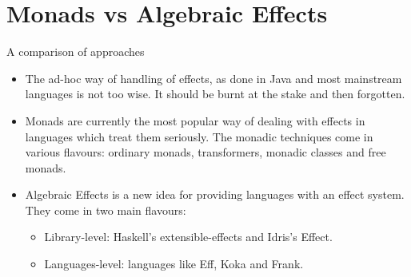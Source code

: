 \documentclass{beamer}
\begin{document}
\section{Monads vs Algebraic Effects}

\begin{frame}{A comparison of approaches}
\begin{itemize}
	\item The ad-hoc way of handling of effects, as done in Java and most mainstream languages is not too wise. It should be burnt at the stake and then forgotten.
	\item Monads are currently the most popular way of dealing with effects in languages which treat them seriously. The monadic techniques come in various flavours: ordinary monads, transformers, monadic classes and free monads.
	\item Algebraic Effects is a new idea for providing languages with an effect system. They come in two main flavours:
	\begin{itemize}
		\item Library-level: Haskell's extensible-effects and Idris's Effect.
		\item Languages-level: languages like Eff, Koka and Frank.
	\end{itemize}
\end{itemize}
\end{frame}
\end{document}
